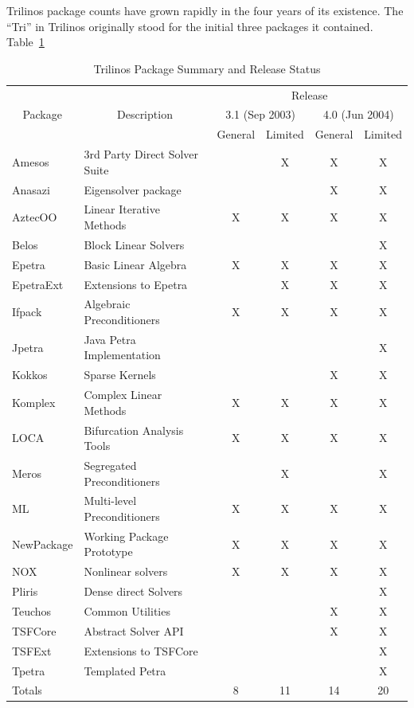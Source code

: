 \documentclass[acmtoms,acmnow]{acmtrans2m}
\begin{document}
Trilinos package counts have grown rapidly in the four years of its
existence.  The ``Tri'' in Trilinos originally stood for the initial
three packages it contained.  Table~\ref{Table:PackageList}
\begin{table}
\begin{center}
\begin{tabular}{|l|l|c|c|c|c|}\hline
        &             & \multicolumn{4}{|c|}{Release} \\
\multicolumn{1}{|c|}{Package} &
\multicolumn{1}{|c|}{Description} &
\multicolumn{2}{|c|}{3.1 (Sep 2003)} &
\multicolumn{2}{|c|}{4.0 (Jun 2004)}\\
          &   & General & Limited &General &Limited \\\hline
Amesos& 3rd Party Direct Solver Suite  &  & X& X& X \\\hline
Anasazi& Eigensolver package           &  &  & X& X \\\hline
AztecOO& Linear Iterative Methods      & X& X& X& X \\\hline
Belos& Block Linear Solvers            &  &  &  & X \\\hline
Epetra& Basic Linear Algebra           & X& X& X& X \\\hline
EpetraExt& Extensions to Epetra        &  & X& X& X \\\hline
Ifpack& Algebraic Preconditioners      & X& X& X& X \\\hline
Jpetra& Java Petra Implementation      &  &  &  & X \\\hline
Kokkos& Sparse Kernels                 &  &  & X& X \\\hline
Komplex& Complex Linear Methods        & X& X& X& X \\\hline
LOCA& Bifurcation Analysis Tools       & X& X& X& X \\\hline
Meros& Segregated Preconditioners      &  & X&  & X \\\hline
ML& Multi-level Preconditioners        & X& X& X& X \\\hline
NewPackage& Working Package Prototype  & X& X& X& X \\\hline
NOX& Nonlinear solvers                 & X& X& X& X \\\hline
Pliris& Dense direct Solvers           &  &  &  & X \\\hline
Teuchos& Common Utilities              &  &  & X& X \\\hline
TSFCore& Abstract Solver API           &  &  & X& X \\\hline
TSFExt& Extensions to TSFCore          &  &  &  & X \\\hline
Tpetra& Templated Petra                &  &  &  & X \\\hline\hline
Totals&                                & 8&11&14&20 \\\hline
\end{tabular}
\caption{\label{Table:PackageList} Trilinos Package Summary and
Release Status}
\end{center}
\end{table}
\end{document}
